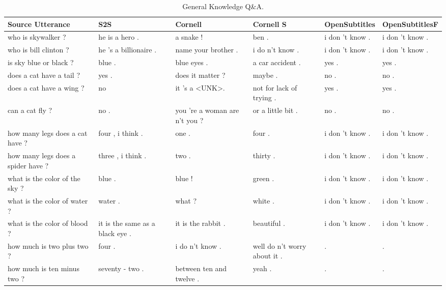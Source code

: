 \documentclass[12pt]{article}
\begin{document}
\begin{table}[H]
	\centering
	\begin{tabular}{|L{2.3cm}|L{2.3cm}|L{2.3cm}|L{2.3cm}|L{2.3cm}|L{2.3cm}|}
		\hline
		\textbf{Source Utterance} & \textbf{S2S} & \textbf{Cornell} & \textbf{Cornell S} & \textbf{OpenSubtitles} & \textbf{OpenSubtitlesF}\\ \hline
		who is skywalker ? & he is a hero . & a snake ! & ben . & i don 't know . & i don 't know .
		\\ \hline
		who is bill clinton ? & he 's a billionaire . & name your brother . & i do n't know . & i don 't know . & i don 't know .
		\\ \hline
		is sky blue or black ? & blue . & blue eyes . & a car accident . & yes . & yes .
		\\ \hline
		does a cat have a tail ? & yes . & does it matter ?  & maybe . & no . & no .
		\\ \hline
		does a cat have a wing ? & no & it 's a \textless UNK\textgreater . & not for lack of trying . & yes . & yes .
		\\ \hline
		can a cat fly ? & no . & you 're a woman are n't you ? & or a little bit . & no . & no .
		\\ \hline
		how many legs does a cat have ? & four , i think . & one .  & four . & i don 't know . & i don 't know .
		\\ \hline
		how many legs does a spider have ? & three , i think . & two . & thirty . & i don 't know . & i don 't know .
		\\ \hline
		what is the color of the sky ? & blue . & blue !  & green . & i don 't know . & i don 't know .
		\\ \hline
		what is the color of water ? & water . & what ? & white . & i don 't know . & i don 't know .
		\\ \hline
		what is the color of blood ? & it is the same as a black eye . & it is the rabbit . & beautiful . & i don 't know . & i don 't know .
		\\ \hline
		how much is two plus two ? & four . & i do n't know . & well do n't worry about it . & . & .
		\\ \hline
		how much is ten minus two ? & seventy - two . & between ten and twelve .  & yeah . & . & .
		\\ \hline
		
	\end{tabular}
	\caption{General Knowledge Q\&A.}	
	\label{table:genKnowledgeNCM}
\end{table}
\end{document}
